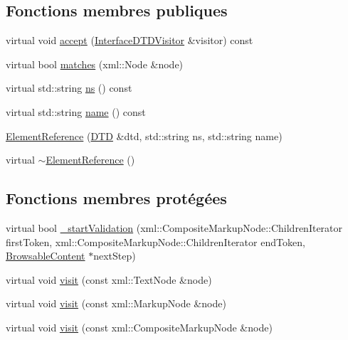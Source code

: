 \subsection*{Fonctions membres publiques}
\begin{DoxyCompactItemize}
\item 
virtual void \hyperlink{classdtd_1_1_element_reference_ade77978609f7a872d73c9507057f12a6}{accept} (\hyperlink{classdtd_1_1_interface_d_t_d_visitor}{InterfaceDTDVisitor} \&visitor) const 
\item 
virtual bool \hyperlink{classdtd_1_1_element_reference_addbee5c126c3df5a509398343fe3d043}{matches} (xml::Node \&node)
\item 
virtual std::string \hyperlink{classdtd_1_1_element_reference_a24bcadd2a54f4195d84e583d8c2fc807}{ns} () const 
\item 
virtual std::string \hyperlink{classdtd_1_1_element_reference_aa478c58671bcfb2708364fb7dea35a29}{name} () const 
\item 
\hyperlink{classdtd_1_1_element_reference_a9b1697e8b813ba8214b028e2058bde8c}{ElementReference} (\hyperlink{classdtd_1_1_d_t_d}{DTD} \&dtd, std::string ns, std::string name)
\item 
virtual \hyperlink{classdtd_1_1_element_reference_ab95dafaf2cc11bafbd94ecc74f9f0c7f}{$\sim$ElementReference} ()
\end{DoxyCompactItemize}
\subsection*{Fonctions membres protégées}
\begin{DoxyCompactItemize}
\item 
virtual bool \hyperlink{classdtd_1_1_element_reference_a04d0141fbcfd0ff6171cd085c91e5622}{\_\-startValidation} (xml::CompositeMarkupNode::ChildrenIterator firstToken, xml::CompositeMarkupNode::ChildrenIterator endToken, \hyperlink{classdtd_1_1_browsable_content}{BrowsableContent} $\ast$nextStep)
\item 
virtual void \hyperlink{classdtd_1_1_element_reference_a4ffa8db697a0da84571c01623b9ab969}{visit} (const xml::TextNode \&node)
\item 
virtual void \hyperlink{classdtd_1_1_element_reference_aa983fa6f899fdfc9ad7769f5a479dce4}{visit} (const xml::MarkupNode \&node)
\item 
virtual void \hyperlink{classdtd_1_1_element_reference_a623d753307b938b9b29501bb96d9503d}{visit} (const xml::CompositeMarkupNode \&node)
\end{DoxyCompactItemize}

